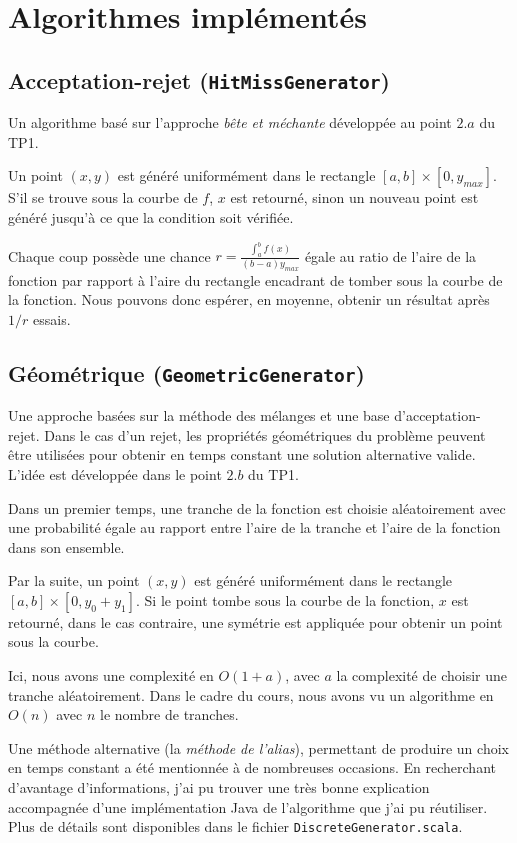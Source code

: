 \documentclass[a4paper,11pt]{article}
\begin{document}
\section{Algorithmes implémentés}

\subsection{Acceptation-rejet {\normalfont({\tt HitMissGenerator})}}

Un algorithme basé sur l'approche \emph{bête et méchante} développée au point $2.a$ du TP1.

Un point $(x, y)$ est généré uniformément dans le rectangle $[a, b]\times[0,y_{max}]$. S'il se trouve sous la courbe de $f$, $x$ est retourné, sinon un nouveau point est généré jusqu'à ce que la condition soit vérifiée.

Chaque coup possède une chance $r = \frac{\int_{a}^{b}f(x)}{(b-a) y_{max}}$ égale au ratio de l'aire de la fonction par rapport à l'aire du rectangle encadrant de tomber sous la courbe de la fonction. Nous pouvons donc espérer, en moyenne, obtenir un résultat après $1/r$ essais.

\subsection{Géométrique {\normalfont({\tt GeometricGenerator})}}

Une approche basées sur la méthode des mélanges et une base d'acceptation-rejet. Dans le cas d'un rejet, les propriétés géométriques du problème peuvent être utilisées pour obtenir en temps constant une solution alternative valide. L'idée est développée dans le point $2.b$ du TP1.

Dans un premier temps, une tranche de la fonction est choisie aléatoirement avec une probabilité égale au rapport entre l'aire de la tranche et l'aire de la fonction dans son ensemble.

Par la suite, un point $(x, y)$ est généré uniformément dans le rectangle $[a, b]\times[0,y_0+y_1]$. Si le point tombe sous la courbe de la fonction, $x$ est retourné, dans le cas contraire, une symétrie est appliquée pour obtenir un point sous la courbe. 

Ici, nous avons une complexité en $O(1 + a)$, avec $a$ la complexité de choisir une tranche aléatoirement. Dans le cadre du cours, nous avons vu un algorithme en $O(n)$ avec $n$ le nombre de tranches.

Une méthode alternative (la \emph{méthode de l'alias}), permettant de produire un choix en temps constant a été mentionnée à de nombreuses occasions. En recherchant d'avantage d'informations, j'ai pu trouver une très bonne explication accompagnée d'une implémentation Java de l'algorithme que j'ai pu réutiliser. Plus de détails sont disponibles dans le fichier \texttt{DiscreteGenerator.scala}.
\end{document}

